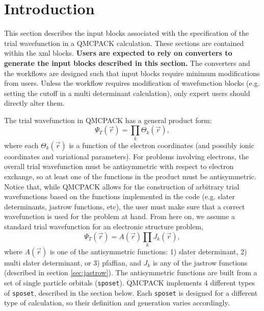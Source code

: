 \section{Introduction}
\label{sec:intro_wavefunction}

This section describes the input blocks associated with the specification of the trial wavefunction in a QMCPACK calculation. These sections are contained within the  xml blocks. \textbf{Users are expected to rely on converters to generate the input blocks described in this section.} The converters and the workflows are designed such that input blocks require minimum modifications from users. Unless the workflow requires modification of wavefunction blocks (e.g. setting the cutoff in a multi determinant calculation), only expert users should directly alter them.
  
The trial wavefunction in QMCPACK has a general product form:
\begin{equation}
\Psi_T(\vec{r}) = \prod_k \Theta_k(\vec{r}),
\end{equation}
where each $\Theta_k(\vec{r})$ is a function of the electron coordinates (and possibly ionic coordinates and variational parameters). For problems involving electrons, the overall trial wavefunction must be antisymmetric with respect to electron exchange, so at least one of the functions in the product must be antisymmetric. Notice that, while QMCPACK allows for the construction of arbitrary trial wavefunctions based on the functions implemented in the code (e.g. slater determinants, jastrow functions, etc), the user must make sure that a correct wavefunction is used for the problem at hand. From here on, we assume a standard trial wavefunction for an electronic structure problem, 
\begin{equation}
\Psi_T(\vec{r}) =  \textit{A}(\vec{r}) \prod_k \textit{J}_k(\vec{r}),
\end{equation}
where $\textit{A}(\vec{r})$ is one of the antisymmetric functions: 1) slater determinant, 2) multi slater determinant, or 3) pfaffian, and $\textit{J}_k$ is any of the jastrow functions (described in section \ref{sec:jastrow}).  The antisymmetric functions are built from a set of single particle orbitals (\texttt{sposet}). QMCPACK implements 4 different types of \texttt{sposet}, described in the section below. Each \texttt{sposet} is designed for a different type of calculation, so their definition and generation varies accordingly. 
